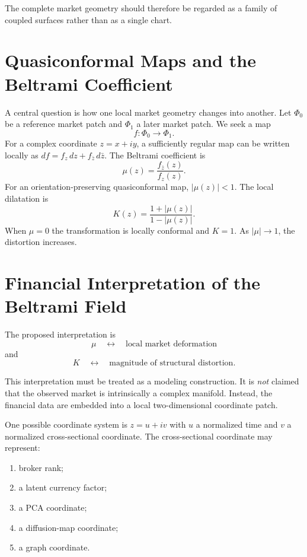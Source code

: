 \documentclass[11pt,a4paper]{article}
\numberwithin{equation}{section}
\newcommand{\abs}[1]{\left|#1\right|}
\begin{document}
The complete market geometry should therefore be regarded as a
family of coupled surfaces rather than as a single chart.

\section{Quasiconformal Maps and the Beltrami Coefficient}\label{sec:qc}

A central question is how one local market geometry changes into
another. Let $\Phi_0$ be a reference market patch and $\Phi_1$ a
later market patch. We seek a map
\begin{equation}
f:\Phi_0\rightarrow\Phi_1.
\end{equation}
For a complex coordinate $z=x+iy$, a sufficiently regular map can be
written locally as $df=f_z\,dz+f_{\bar z}\,d\bar z$. The Beltrami
coefficient is
\begin{equation}
\mu(z)=\frac{f_{\bar z}(z)}{f_z(z)}.
\label{eq:beltrami}
\end{equation}
For an orientation-preserving quasiconformal map, $\abs{\mu(z)}<1$.
The local dilatation is
\begin{equation}
K(z)=\frac{1+\abs{\mu(z)}}{1-\abs{\mu(z)}}.
\label{eq:dilatation}
\end{equation}
When $\mu=0$ the transformation is locally conformal and $K=1$. As
$\abs{\mu}\rightarrow1$, the distortion increases.

\section{Financial Interpretation of the Beltrami Field}
\label{sec:beltrami-interp}

The proposed interpretation is
\[
\boxed{\mu\quad\leftrightarrow\quad\text{local market deformation}}
\]
and
\[
\boxed{K\quad\leftrightarrow\quad
\text{magnitude of structural distortion}.}
\]

This interpretation must be treated as a modeling construction. It
is \emph{not} claimed that the observed market is intrinsically a
complex manifold. Instead, the financial data are embedded into a
local two-dimensional coordinate patch.

One possible coordinate system is $z=u+iv$ with $u$ a normalized
time and $v$ a normalized cross-sectional coordinate. The
cross-sectional coordinate may represent:
\begin{enumerate}
\item broker rank;
\item a latent currency factor;
\item a PCA coordinate;
\item a diffusion-map coordinate;
\item a graph coordinate.
\end{enumerate}
\end{document}
